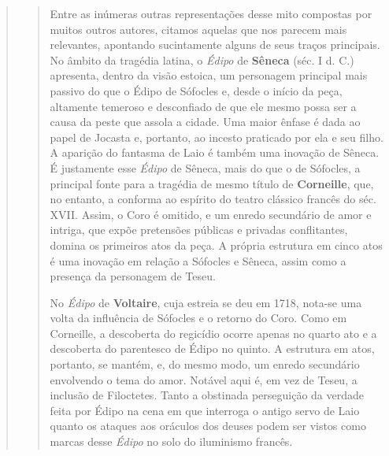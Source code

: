 \begin{verse}
\begin{verse}
Entre as inúmeras outras representações desse mito compostas por muitos
outros autores, citamos aquelas que nos parecem mais relevantes,
apontando sucintamente alguns de seus traços principais. No âmbito da
tragédia latina, o \emph{Édipo} de \textbf{Sêneca} (séc. I d. C.)
apresenta, dentro da visão estoica, um personagem principal mais passivo
do que o Édipo de Sófocles e, desde o início da peça, altamente temeroso
e desconfiado de que ele mesmo possa ser a causa da peste que assola a
cidade. Uma maior ênfase é dada ao papel de Jocasta e, portanto, ao
incesto praticado por ela e seu filho. A aparição do fantasma de Laio é
também uma inovação de Sêneca. É justamente esse \emph{Édipo} de Sêneca,
mais do que o de Sófocles, a principal fonte para a tragédia de mesmo
título de \textbf{Corneille}, que, no entanto, a conforma ao espírito do
teatro clássico francês do séc. XVII. Assim, o Coro é omitido, e um
enredo secundário de amor e intriga, que expõe pretensões públicas e
privadas conflitantes, domina os primeiros atos da peça. A própria
estrutura em cinco atos é uma inovação em relação a Sófocles e Sêneca,
assim como a presença da personagem de Teseu.

No \emph{Édipo} de \textbf{Voltaire}, cuja estreia se deu em 1718,
nota-se uma volta da influência de Sófocles e o retorno do Coro. Como em
Corneille, a descoberta do regicídio ocorre apenas no quarto ato e a
descoberta do parentesco de Édipo no quinto. A estrutura em atos,
portanto, se mantém, e, do mesmo modo, um enredo secundário envolvendo o
tema do amor. Notável aqui é, em vez de Teseu, a inclusão de Filoctetes.
Tanto a obstinada perseguição da verdade feita por Édipo na cena em que
interroga o antigo servo de Laio quanto os ataques aos oráculos dos
deuses podem ser vistos como marcas desse \emph{Édipo} no solo do
iluminismo francês.


\end{verse}
\end{verse}

